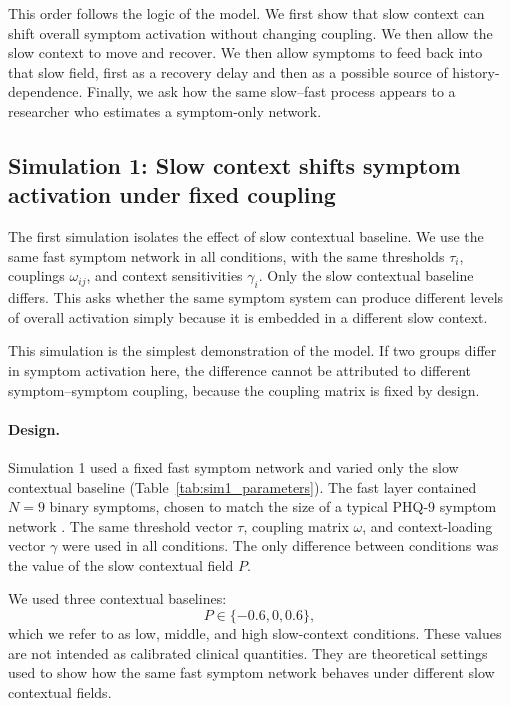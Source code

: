 \documentclass[man,12pt,floatsintext]{apa7}
\begin{document}
This order follows the logic of the model. We first show that slow context can
shift overall symptom activation without changing coupling. We then allow the
slow context to move and recover. We then allow symptoms to feed back into that
slow field, first as a recovery delay and then as a possible source of
history-dependence. Finally, we ask how the same slow--fast process appears to
a researcher who estimates a symptom-only network.

\subsection{Simulation 1: Slow context shifts symptom activation under fixed coupling}
The first simulation isolates the effect of slow contextual baseline. We use
the same fast symptom network in all conditions, with the same thresholds
\(\tau_i\), couplings \(\omega_{ij}\), and context sensitivities \(\gamma_i\).
Only the slow contextual baseline differs. This asks whether the same symptom
system can produce different levels of overall activation simply because it is
embedded in a different slow context.

This simulation is the simplest demonstration of the model. If two groups
differ in symptom activation here, the difference cannot be attributed to
different symptom--symptom coupling, because the coupling matrix is fixed by
design.

\paragraph{Design.}
Simulation 1 used a fixed fast symptom network and varied only the slow
contextual baseline (Table~\ref{tab:sim1_parameters}). The fast layer contained \(N=9\) binary symptoms, chosen
to match the size of a typical PHQ-9 symptom network \parencite{cramer2016major}. The same threshold vector
\(\tau\), coupling matrix \(\omega\), and context-loading vector \(\gamma\)
were used in all conditions. The only difference between conditions was the
value of the slow contextual field \(P\).

We used three contextual baselines:
\[
P \in \{-0.6, 0, 0.6\},
\]
which we refer to as low, middle, and high slow-context conditions. These
values are not intended as calibrated clinical quantities. They are theoretical
settings used to show how the same fast symptom network behaves under different
slow contextual fields.
\end{document}
